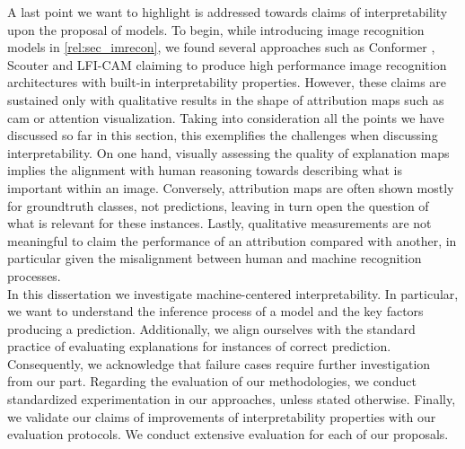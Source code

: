 \noindent A last point we want to highlight is addressed towards claims of interpretability upon 
the proposal of models. To begin, while introducing image recognition models in 
\autoref{rel:sec_imrecon}, we found several approaches such as Conformer 
\autocite{peng2021conformer}, Scouter \autocite{li2021scouter} and LFI-CAM \autocite{lee2021lfi} 
claiming to produce high performance image recognition architectures with built-in interpretability 
properties. However, these claims are sustained only with qualitative results in the 
shape of attribution maps such as \gls{cam} or attention visualization. Taking into consideration 
all the points we have discussed so far in this section, this exemplifies the 
challenges when discussing interpretability. On one hand, visually assessing the quality of 
explanation maps implies the alignment with human reasoning towards describing what is important 
within an image. Conversely, attribution maps are often shown mostly for groundtruth classes, not 
predictions, leaving in turn open the question of what is relevant for these instances. Lastly, 
qualitative measurements are not meaningful to claim the performance of an attribution compared 
with another, in particular given the misalignment between human and machine recognition processes.\\

\noindent In this dissertation we investigate machine-centered interpretability. In particular, 
we want to understand the inference process of a model and the key factors producing a prediction. 
Additionally, we align ourselves with the standard practice of evaluating explanations for 
instances of correct prediction. Consequently, we acknowledge that failure cases require further 
investigation from our part. Regarding the evaluation of our methodologies, we conduct standardized 
experimentation in our approaches, unless stated otherwise. Finally, we validate our claims of 
improvements of interpretability properties with our evaluation protocols. We conduct extensive 
evaluation for each of our proposals.\\
